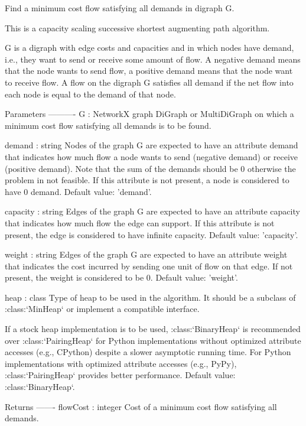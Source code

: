 \begin{DoxyVerb}Find a minimum cost flow satisfying all demands in digraph G.

This is a capacity scaling successive shortest augmenting path algorithm.

G is a digraph with edge costs and capacities and in which nodes
have demand, i.e., they want to send or receive some amount of
flow. A negative demand means that the node wants to send flow, a
positive demand means that the node want to receive flow. A flow on
the digraph G satisfies all demand if the net flow into each node
is equal to the demand of that node.

Parameters
----------
G : NetworkX graph
    DiGraph or MultiDiGraph on which a minimum cost flow satisfying all
    demands is to be found.

demand : string
    Nodes of the graph G are expected to have an attribute demand
    that indicates how much flow a node wants to send (negative
    demand) or receive (positive demand). Note that the sum of the
    demands should be 0 otherwise the problem in not feasible. If
    this attribute is not present, a node is considered to have 0
    demand. Default value: 'demand'.

capacity : string
    Edges of the graph G are expected to have an attribute capacity
    that indicates how much flow the edge can support. If this
    attribute is not present, the edge is considered to have
    infinite capacity. Default value: 'capacity'.

weight : string
    Edges of the graph G are expected to have an attribute weight
    that indicates the cost incurred by sending one unit of flow on
    that edge. If not present, the weight is considered to be 0.
    Default value: 'weight'.

heap : class
    Type of heap to be used in the algorithm. It should be a subclass of
    :class:`MinHeap` or implement a compatible interface.

    If a stock heap implementation is to be used, :class:`BinaryHeap` is
    recommended over :class:`PairingHeap` for Python implementations without
    optimized attribute accesses (e.g., CPython) despite a slower
    asymptotic running time. For Python implementations with optimized
    attribute accesses (e.g., PyPy), :class:`PairingHeap` provides better
    performance. Default value: :class:`BinaryHeap`.

Returns
-------
flowCost : integer
    Cost of a minimum cost flow satisfying all demands.


\end{DoxyVerb}
